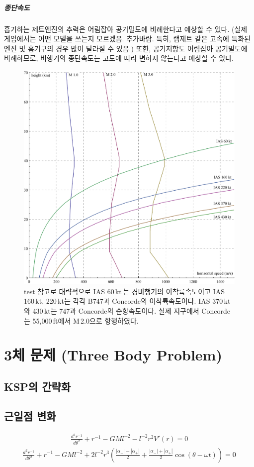 \documentclass[9pt]{amsbook}
\begin{document}
\paragraph{종단속도}
흡기하는 제트엔진의 추력은 어림잡아 공기밀도에 비례한다고 예상할 수 있다. (실제 게임에서는 어떤 모델을 쓰는지 모르겠음. 추가바람. 특히, 램제트 같은 고속에 특화된 엔진 및 흡기구의 경우 많이 달라질 수 있음.) 또한, 공기저항도 어림잡아 공기밀도에 비례하므로, 비행기의 종단속도는 고도에 따라 변하지 않는다고 예상할 수 있다.
\begin{figure}
\includegraphics[width=\textwidth]{ias.pdf}
\caption{test 참고로 대략적으로 IAS 60\,kt\,는 경비행기의 이착륙속도이고 IAS 160\,kt, 220\,kt는 각각 B747과 Concorde의 이착륙속도이다. IAS 370\,kt와 430\,kt는 747과 Concorde의 순항속도이다. 실제 지구에서 Concorde는 55,000\,ft에서 M\,2.0으로 항행하였다.}
\end{figure}

\chapter{3체 문제 (Three Body Problem)}
\section{KSP의 간략화}
\section{근일점 변화}
\begin{align}
	\frac{d^2r^{-1}}{d\theta^2}+r^{-1}-GMl^{-2}-l^{-2}r^2V'(r) = 0
\end{align}
\begin{align}
	\frac{d^2r^{-1}}{d\theta^2}+r^{-1}-GMl^{-2}+2 l^{-2}r^3 \left(\frac{|\alpha_-| -|\alpha_+|}{2}+\frac{|\alpha_-| +|\alpha_+|}{2}\cos(\theta-\omega t)\right)= 0
\end{align}
\end{document}
